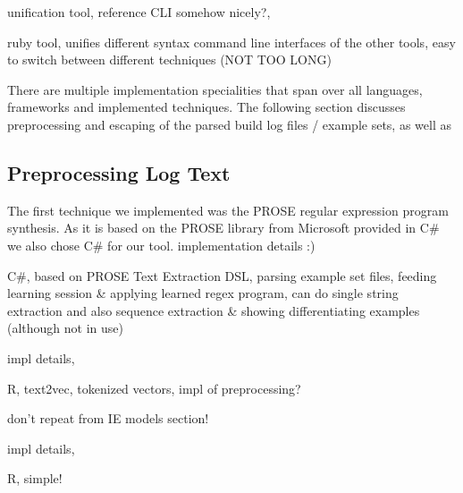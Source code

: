 \documentclass[\myrootdir/main.tex]{subfiles}
\begin{document}
unification tool, reference CLI somehow nicely?,

ruby tool, unifies different syntax command line interfaces of the other tools, easy to switch between different techniques (NOT TOO LONG)

There are multiple implementation specialities that span over all languages, frameworks and implemented techniques.
The following section discusses preprocessing and escaping of the parsed build log files / example sets, as well as\textellipsis {}

\subsection*{Preprocessing Log Text}
\label{sec:impl-preprocessing}

\label{sec:impl-pbe}
The first technique we implemented was the PROSE regular expression program synthesis. As it is based on the PROSE library from Microsoft provided in C\# we also chose C\# for our tool. 
implementation details :)

C\#, based on PROSE Text Extraction DSL, parsing example set files, feeding learning session \& applying learned regex program, can do single string extraction and also sequence extraction \& showing differentiating examples (although not in use)

\label{sec:impl-ts}
impl details,

R, text2vec, tokenized vectors, impl of preprocessing?

don't repeat from IE models section!

\label{sec:impl-skws}
impl details,

R, simple!
\end{document}
